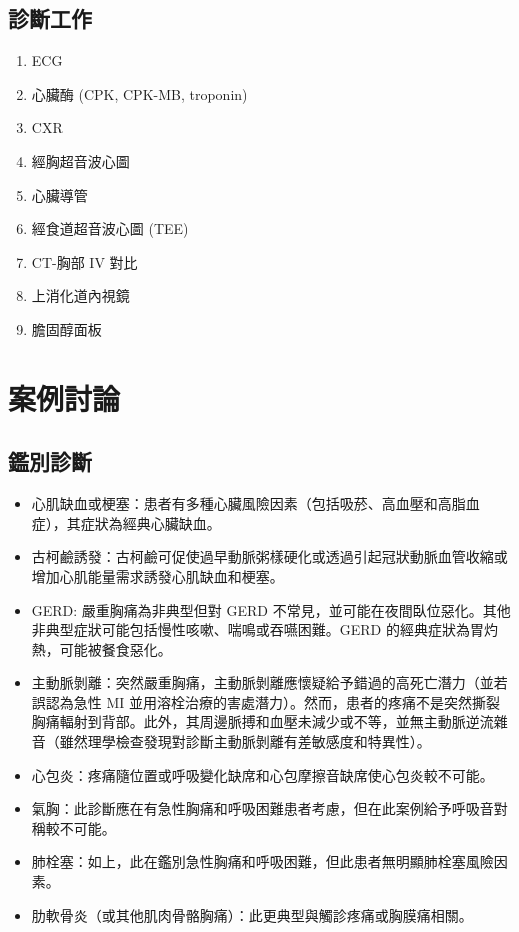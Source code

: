 \documentclass{article}
\begin{document}
\subsection{診斷工作}
\begin{enumerate}
\item ECG
\item 心臟酶 (CPK, CPK-MB, troponin)
\item CXR
\item 經胸超音波心圖
\item 心臟導管
\item 經食道超音波心圖 (TEE)
\item CT-胸部 IV 對比
\item 上消化道內視鏡
\item 膽固醇面板
\end{enumerate}

\section{案例討論}

\subsection{鑑別診斷}
\begin{itemize}
\item 心肌缺血或梗塞：患者有多種心臟風險因素（包括吸菸、高血壓和高脂血症），其症狀為經典心臟缺血。
\item 古柯鹼誘發：古柯鹼可促使過早動脈粥樣硬化或透過引起冠狀動脈血管收縮或增加心肌能量需求誘發心肌缺血和梗塞。
\item GERD: 嚴重胸痛為非典型但對 GERD 不常見，並可能在夜間臥位惡化。其他非典型症狀可能包括慢性咳嗽、喘鳴或吞嚥困難。GERD 的經典症狀為胃灼熱，可能被餐食惡化。
\item 主動脈剝離：突然嚴重胸痛，主動脈剝離應懷疑給予錯過的高死亡潛力（並若誤認為急性 MI 並用溶栓治療的害處潛力）。然而，患者的疼痛不是突然撕裂胸痛輻射到背部。此外，其周邊脈搏和血壓未減少或不等，並無主動脈逆流雜音（雖然理學檢查發現對診斷主動脈剝離有差敏感度和特異性）。
\item 心包炎：疼痛隨位置或呼吸變化缺席和心包摩擦音缺席使心包炎較不可能。
\item 氣胸：此診斷應在有急性胸痛和呼吸困難患者考慮，但在此案例給予呼吸音對稱較不可能。
\item 肺栓塞：如上，此在鑑別急性胸痛和呼吸困難，但此患者無明顯肺栓塞風險因素。
\item 肋軟骨炎（或其他肌肉骨骼胸痛）：此更典型與觸診疼痛或胸膜痛相關。
\end{itemize}
\end{document}
